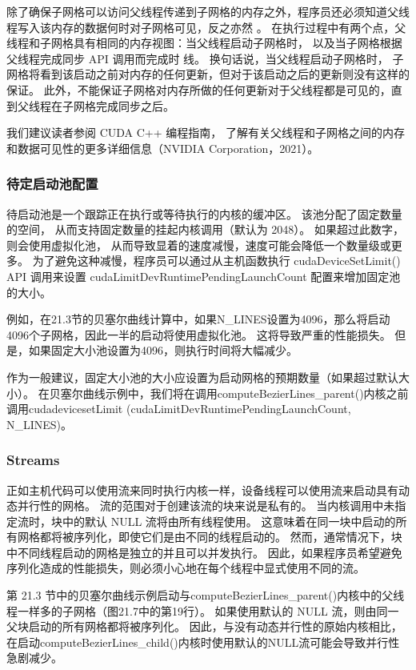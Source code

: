 除了确保子网格可以访问父线程传递到子网格的内存之外，程序员还必须知道父线程写入该内存的数据何时对子网格可见，反之亦然 。 
在执行过程中有两个点，父线程和子网格具有相同的内存视图：当父线程启动子网格时，
以及当子网格根据父线程完成同步 API 调用而完成时 线。 换句话说，当父线程启动子网格时，
子网格将看到该启动之前对内存的任何更新，但对于该启动之后的更新则没有这样的保证。 
此外，不能保证子网格对内存所做的任何更新对于父线程都是可见的，直到父线程在子网格完成同步之后。

我们建议读者参阅 CUDA C++ 编程指南，
了解有关父线程和子网格之间的内存和数据可见性的更多详细信息（NVIDIA Corporation，2021）。

\subsubsection{待定启动池配置}
待启动池是一个跟踪正在执行或等待执行的内核的缓冲区。 该池分配了固定数量的空间，
从而支持固定数量的挂起内核调用（默认为 2048）。 如果超过此数字，则会使用虚拟化池，
从而导致显着的速度减慢，速度可能会降低一个数量级或更多。 
为了避免这种减慢，程序员可以通过从主机函数执行 cudaDeviceSetLimit() API 调用来设置 cudaLimitDevRuntimePendingLaunchCount 配置来增加固定池的大小。

例如，在21.3节的贝塞尔曲线计算中，如果N\_LINES设置为4096，那么将启动4096个子网格，因此一半的启动将使用虚拟化池。 
这将导致严重的性能损失。 但是，如果固定大小池设置为4096，则执行时间将大幅减少。

作为一般建议，固定大小池的大小应设置为启动网格的预期数量（如果超过默认大小）。 
在贝塞尔曲线示例中，我们将在调用computeBezierLines\_parent()内核之前调用cudadevicesetLimit (cudaLimitDevRuntimePendingLaunchCount, N\_LINES)。

\subsubsection{Streams}
正如主机代码可以使用流来同时执行内核一样，设备线程可以使用流来启动具有动态并行性的网格。 
流的范围对于创建该流的块来说是私有的。 当内核调用中未指定流时，块中的默认 NULL 流将由所有线程使用。 
这意味着在同一块中启动的所有网格都将被序列化，即使它们是由不同的线程启动的。 
然而，通常情况下，块中不同线程启动的网格是独立的并且可以并发执行。 
因此，如果程序员希望避免序列化造成的性能损失，则必须小心地在每个线程中显式使用不同的流。

第 21.3 节中的贝塞尔曲线示例启动与computeBezierLines\_parent()内核中的父线程一样多的子网格（图21.7中的第19行）。 
如果使用默认的 NULL 流，则由同一父块启动的所有网格都将被序列化。 
因此，与没有动态并行性的原始内核相比，
在启动computeBezierLines\_child()内核时使用默认的NULL流可能会导致并行性急剧减少。

